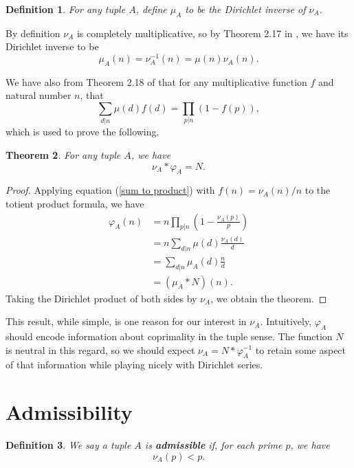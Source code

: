 \documentclass[11pt, leqno]{article}
\newtheorem{theorem}{Theorem}[section]
\newtheorem{definition}[theorem]{Definition}
\begin{document}
\begin{definition}
    For any tuple $A$, define $\mu_A$ to be the Dirichlet inverse
    of $\nu_A$.
\end{definition}

By definition $\nu_A$ is completely multiplicative, so by Theorem 2.17 
in \cite{Apostol}, we have its Dirichlet inverse to be
$$\mu_A(n)=\nu_A^{-1}(n)=\mu(n)\nu_A(n).$$

We have also from Theorem 2.18 of \cite{Apostol} that for any multiplicative function $f$ and natural number $n$, that
\begin{equation}\label{sum to product}
    \sum_{d|n}\mu(d)f(d) = \prod_{p|n}(1-f(p)),
\end{equation}
which is used to prove the following.

\begin{theorem}
    For any tuple $A$, we have
    $$\nu_A*\varphi_A = N.$$
\end{theorem}
\begin{proof}
    Applying equation (\ref{sum to product}) with $f(n)=\nu_A(n)/n$ to the totient product formula, we have
    \begin{align*}
        \varphi_A(n) 
        &= n \prod_{p|n}\left(1-\frac{\nu_A(p)}{p}\right) \\
        &= n \sum_{d|n}\mu(d)\frac{\nu_A(d)}{d} \\
        &= \sum_{d|n}\mu_A(d)\frac{n}{d} \\
        &= (\mu_A\ast N)(n).
    \end{align*}
    Taking the Dirichlet product of both sides by $\nu_A$, we obtain the theorem.
\end{proof}

This result, while simple, is one reason for our interest in $\nu_A$.
Intuitively, $\varphi_A$ should encode information about coprimality
in the tuple sense.
The function $N$ is neutral in this regard, so we should expect
$\nu_A=N\ast\varphi_A^{-1}$ to retain some aspect of that information
while playing nicely with Dirichlet series.

\section{Admissibility}

\begin{definition}
    We say a tuple $A$ is \textbf{admissible} if, for each prime $p$, we have
    $$\nu_A(p)<p.$$
\end{definition}
\end{document}
